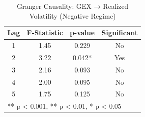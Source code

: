 \begin{table}[htbp]
\centering
\caption{Granger Causality: GEX → Realized Volatility (Negative Regime)}
\label{tab:granger_neg}
\begin{tabular}{cccc}
\toprule
Lag & F-Statistic & p-value & Significant \\
\midrule
1 & 1.45 & 0.229 & No \\
2 & 3.22 & 0.042* & Yes \\
3 & 2.16 & 0.093 & No \\
4 & 2.00 & 0.095 & No \\
5 & 1.75 & 0.125 & No \\
\bottomrule
\multicolumn{4}{l}{\footnotesize *** p < 0.001, ** p < 0.01, * p < 0.05}
\end{tabular}
\end{table}